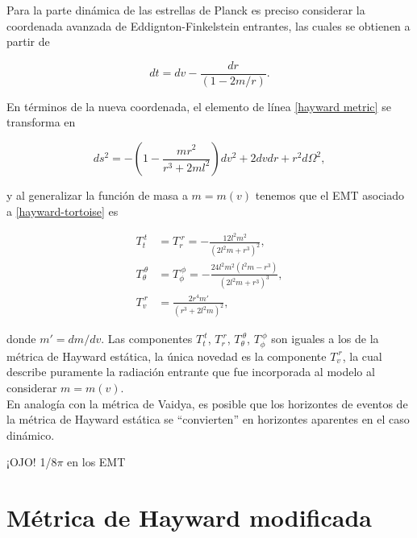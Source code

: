 \documentclass{article}
\numberwithin{equation}{section}
\theoremstyle{definition}
\begin{document}
Para la parte dinámica de las estrellas de Planck es preciso considerar la coordenada avanzada de Eddignton-Finkelstein entrantes, las cuales se obtienen a partir de

\begin{equation}
dt = dv - \frac{dr}{(1 - 2m/r)}.
\end{equation}

En términos de la nueva coordenada, el elemento de línea \eqref{hayward metric} se transforma en 

\begin{equation}
\label{hayward-tortoise}
ds^2 = -\left( 1 - \frac{mr^2}{r^3 + 2ml^2} \right) dv^2 + 2dvdr + r^2d\Omega ^2,
\end{equation}

y al generalizar la función de masa a $m = m(v)$ tenemos que el EMT asociado a \eqref{hayward-tortoise} es

\begin{equation}
\begin{aligned}
T_{t}^{\ t} &= T_{r}^{\ r} = -\frac{12 l^2 m^2}{\left(2 l^2 m+r^3\right)^2}, \\
T_{\theta}^{\ \theta} &= T_{\phi}^{\ \phi} = -\frac{24 l^2 m^2 \left(l^2 m-r^3\right)}{\left(2 l^2 m+r^3\right)^3},\\
T_{v}^{\ r} &= \frac{2r^4m'}{(r^3 + 2l^2m)^2},
\end{aligned}
\end{equation}

donde $m' = dm/dv$. Las componentes $T_{t}^{\ t}$, $T_{r}^{\ r}$, $T_{\theta}^{\ \theta}$, $T_{\phi}^{\ \phi}$ son iguales a los de la métrica de Hayward estática, la única novedad es la componente $T_{v}^{\ r}$, la cual describe puramente la radiación entrante que fue incorporada al modelo al considerar $m = m(v)$.\\

En analogía con la métrica de Vaidya, es posible que los horizontes de eventos de la métrica de Hayward estática se ``convierten'' en horizontes aparentes en el caso dinámico. 

¡OJO! 1/8$\pi$ en los EMT

\section{Métrica de Hayward modificada}
\end{document}
